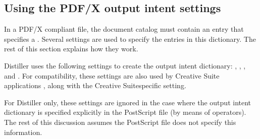 \documentclass[letterpaper,12pt,english,openany,oneside]{sphinxmanual}
\begin{document}
\subsection{Using the PDF/X output intent settings}
\label{\detokenize{PDF_Create_UsingSettings:using-the-pdf-x-output-intent-settings}}
In a PDF/X compliant file, the document catalog must contain an  entry that specifies a  . Several settings are used to specify the entries in this dictionary. The rest of this section explains how they work.

Distiller uses the following settings to create the output intent dictionary:  ,  ,  , and  . For compatibility, these settings are also used by Creative Suite applications , along with the Creative Suite\sphinxhyphen{}specific  setting.

For Distiller only, these settings are ignored in the case where the output intent dictionary is specified explicitly in the PostScript file (by means of  operators). The rest of this discussion assumes the PostScript file does not specify this information.
\end{document}
